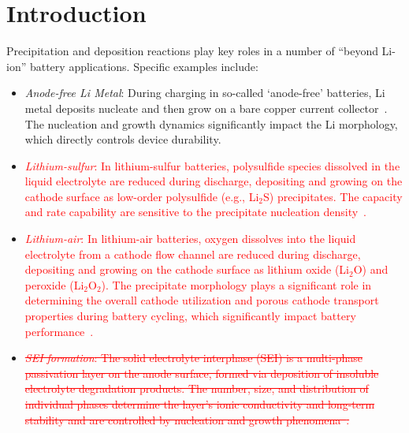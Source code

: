 \documentclass[final,3p,times,twocolumn, 12pt]{elsarticle}
\begin{document}
\section{Introduction}
Precipitation and deposition reactions play key roles in a number of ``beyond Li-ion'' battery applications. Specific examples include:
    \begin{itemize}
        \item \textit{Anode-free Li Metal}: During charging in so-called `anode-free' batteries, Li metal deposits nucleate and then grow on a bare copper current collector~\cite{bib:Li-Cu_deposition}. The nucleation and growth dynamics significantly impact the Li morphology, which directly controls device durability. \cite{bib:PSD_effects_Li,bib:PSD_effects_Li_2,bib:PSD_effects_Li_3,bib:PSD_effects_Li_4,bib:Model_ex_1}
        
        \item \textcolor{red}{\textit{Lithium-sulfur}: In lithium-sulfur batteries, polysulfide species dissolved in the liquid electrolyte are reduced during discharge, depositing and growing on the cathode surface as low-order polysulfide (e.g., Li$_2$S) precipitates. The capacity and rate capability are sensitive to the precipitate nucleation density~\cite{bib:Li-S_deposition,bib:Li-S_deposition_2,bib:Model_ex_8}.}
               
        \item \textcolor{red}{\textit{Lithium-air}: In lithium-air batteries, oxygen dissolves into the liquid electrolyte from a cathode flow channel are reduced during discharge, depositing and growing on the cathode surface as lithium oxide (Li$_2$O) and peroxide (Li$_2$O$_2$). The precipitate morphology plays a significant role in determining the overall cathode utilization and porous cathode transport properties during battery cycling, which significantly impact battery performance~\cite{bib:Li-O_deposition,bib:Li-air_deposition}.}
        
        \item \textcolor{red}{\sout{\textit{SEI formation}: The solid electrolyte interphase (SEI) is a multi-phase passivation layer on the anode surface, formed via deposition of insoluble electrolyte degradation products. The number, size, and distribution of individual phases determine the layer's ionic conductivity and long-term stability and are controlled by nucleation and growth phenomena~\cite{bib:SEI_deposition,bib:SEI_deposition_2,bib:SEI_deposition_3}.}}
    \end{itemize}
\end{document}
